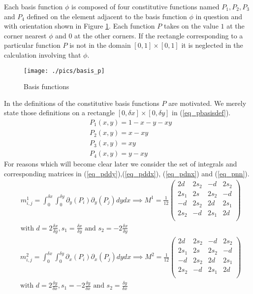 \documentclass[11pt,fleqn]{article}
\theoremstyle{defstyle}
\begin{document}
Each basis function $\phi$ is composed of four constitutive functions named $P_1, P_2, P_3$ and $P_4$ defined on the element adjacent to the basis function $\phi$ in question and with orientation shown in Figure \ref{fig_pbasis}. Each function $P$ takes on the value $1$ at the corner nearest $\phi$ and $0$ at the other corners. If the rectangle corresponding to a particular function $P$ is not in the domain $[0,1]\times[0,1]$ it is neglected in the calculation involving that $\phi$. 
\begin{figure}[H] 
\centering
\texttt{[image: ./pics/basis\_p]}
\caption{Basis functions} 
\label{fig_pbasis}
\end{figure}
In \cite{vrb} the definitions of the constitutive basis functions $P$ are motivated. We merely state those definitions on a rectangle $[0,\delta x] \times [0, \delta y]$ in (\ref{eq_pbasisdef}). 
\begin{equation}
\begin{aligned}
&P_1(x,y) = 1 -x-y-xy \\
&P_2(x,y) = x-xy \\
&P_3(x,y) = xy \\
&P_4(x,y) = y-xy 
\label{eq_pbasisdef}
\end{aligned}
\end{equation}  
For reasons which will become clear later we consider the set of integrals and corresponding matrices in (\ref{eq_pddy}),(\ref{eq_pddx}),  (\ref{eq_pdnx}) and (\ref{eq_pnn}).
\begin{equation}
\begin{aligned}
&m^1_{i,j} = \int_0^{\delta x} \int_0^{\delta y} \partial_y(P_i) \partial_y(P_j) dydx \implies
M^1 = \frac{1}{12}\begin{pmatrix}
2d & 2s_2 & -d & 2s_2 \\
2s_1 & 2s & 2s_2 & -d \\
-d & 2s_2 & 2d & 2s_1 \\
2s_2 & -d & 2s_1 & 2d \\
\end{pmatrix} \\
&\text{with } d = 2\frac{\delta x}{\delta y}, s_1 = \frac{\delta x}{\delta y} \text{ and } s_2 = -2\frac{\delta x}{\delta y}
\end{aligned}
\label{eq_pddy}
\end{equation}
\begin{equation}
\begin{aligned}
&m^2_{i,j} = \int_0^{\delta x} \int_0^{\delta y} \partial_x(P_i) \partial_x(P_j) dydx \implies
M^2 = \frac{1}{12}\begin{pmatrix}
2d & 2s_2 & -d & 2s_2 \\
2s_1 & 2s & 2s_2 & -d \\
-d & 2s_2 & 2d & 2s_1 \\
2s_2 & -d & 2s_1 & 2d \\
\end{pmatrix} \\
&\text{with } d = 2\frac{\delta y}{\delta x}, s_1 = -2\frac{\delta y}{\delta x} \text{ and } s_2 = \frac{\delta y}{\delta x}
\end{aligned}
\label{eq_pddx}
\end{equation}
\end{document}
